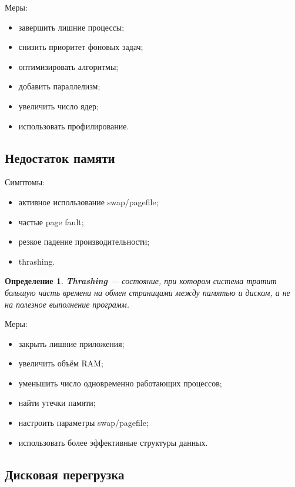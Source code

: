 \documentclass[12pt,a4paper]{article}
\newtheorem{definition}{Определение}
\begin{document}
Меры:

\begin{itemize}
    \item завершить лишние процессы;
    \item снизить приоритет фоновых задач;
    \item оптимизировать алгоритмы;
    \item добавить параллелизм;
    \item увеличить число ядер;
    \item использовать профилирование.
\end{itemize}

\subsection{Недостаток памяти}

Симптомы:

\begin{itemize}
    \item активное использование swap/pagefile;
    \item частые page fault;
    \item резкое падение производительности;
    \item thrashing.
\end{itemize}

\begin{definition}
\textbf{Thrashing} --- состояние, при котором система тратит большую часть времени на обмен страницами между памятью и диском, а не на полезное выполнение программ.
\end{definition}

Меры:

\begin{itemize}
    \item закрыть лишние приложения;
    \item увеличить объём RAM;
    \item уменьшить число одновременно работающих процессов;
    \item найти утечки памяти;
    \item настроить параметры swap/pagefile;
    \item использовать более эффективные структуры данных.
\end{itemize}

\subsection{Дисковая перегрузка}
\end{document}
